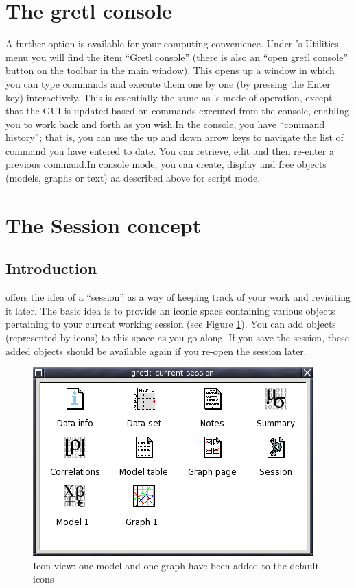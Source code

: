 \section{The gretl console}
\label{console}

A further option is available for your computing
      convenience. Under 's Utilities
      menu you will find the item ``Gretl console'' (there
      is also an ``open gretl console'' button on the
      toolbar in the main window).  This opens up a window in which
      you can type commands and execute them one by one (by pressing
      the Enter key) interactively.  This is essentially the same as
      's mode of operation, except
      that the GUI is updated based on commands executed from the
      console, enabling you to work back and forth as you wish.In the console, you have ``command history'';
      that is, you can use the up and down arrow keys to navigate the
      list of command you have entered to date.  You can retrieve,
      edit and then re-enter a previous command.In console mode, you can create, display and free objects
    (models, graphs or text) aa described above for script mode.

\section{The Session concept}
\label{session}



\subsection{Introduction}
\label{session-intro}


	 offers the idea of a
	``session'' as a way of keeping track of your work
	and revisiting it later. The basic idea is to provide an
	iconic space containing various objects pertaining to your
	current working session (see
      Figure \ref{fig-session}).  You can add objects
	(represented by icons) to this space as you go along.  If you
	save the session, these added objects should be available
	again if you re-open the session later.
\begin{figure}[htbp]
\caption{Icon view: one model and one graph have been added to
	  the default icons}
\label{fig-session}
\begin{center}
\includegraphics[scale=0.5]{figures/session}
\end{center}
\end{figure}

